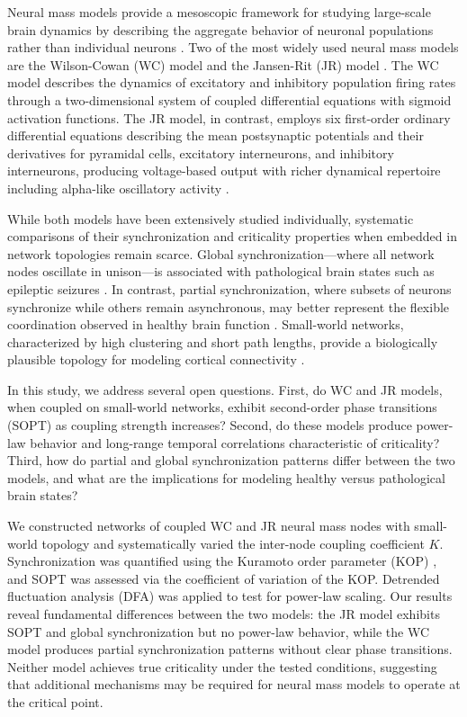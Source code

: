 \documentclass[12pt]{article}
\begin{document}
Neural mass models provide a mesoscopic framework for studying large-scale brain dynamics by describing the aggregate behavior of neuronal populations rather than individual neurons \citep{deco2008dynamic, breakspear2017dynamic}. Two of the most widely used neural mass models are the Wilson-Cowan (WC) model \citep{wilson1972excitatory} and the Jansen-Rit (JR) model \citep{jansen1995electroencephalogram}. The WC model describes the dynamics of excitatory and inhibitory population firing rates through a two-dimensional system of coupled differential equations with sigmoid activation functions. The JR model, in contrast, employs six first-order ordinary differential equations describing the mean postsynaptic potentials and their derivatives for pyramidal cells, excitatory interneurons, and inhibitory interneurons, producing voltage-based output with richer dynamical repertoire including alpha-like oscillatory activity \citep{wendling2002epileptic}.

While both models have been extensively studied individually, systematic comparisons of their synchronization and criticality properties when embedded in network topologies remain scarce. Global synchronization---where all network nodes oscillate in unison---is associated with pathological brain states such as epileptic seizures \citep{jiruska2013synchronization}. In contrast, partial synchronization, where subsets of neurons synchronize while others remain asynchronous, may better represent the flexible coordination observed in healthy brain function \citep{pikovsky2001synchronization}. Small-world networks, characterized by high clustering and short path lengths, provide a biologically plausible topology for modeling cortical connectivity \citep{watts1998collective}.

In this study, we address several open questions. First, do WC and JR models, when coupled on small-world networks, exhibit second-order phase transitions (SOPT) as coupling strength increases? Second, do these models produce power-law behavior and long-range temporal correlations characteristic of criticality? Third, how do partial and global synchronization patterns differ between the two models, and what are the implications for modeling healthy versus pathological brain states?

We constructed networks of coupled WC and JR neural mass nodes with small-world topology and systematically varied the inter-node coupling coefficient $K$. Synchronization was quantified using the Kuramoto order parameter (KOP) \citep{kuramoto1984chemical}, and SOPT was assessed via the coefficient of variation of the KOP. Detrended fluctuation analysis (DFA) \citep{peng1994mosaic} was applied to test for power-law scaling. Our results reveal fundamental differences between the two models: the JR model exhibits SOPT and global synchronization but no power-law behavior, while the WC model produces partial synchronization patterns without clear phase transitions. Neither model achieves true criticality under the tested conditions, suggesting that additional mechanisms may be required for neural mass models to operate at the critical point.
\end{document}
